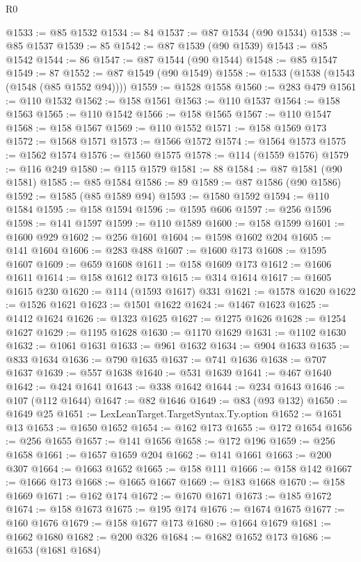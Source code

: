 \begin{lexlean}{R0}
\begin{coremodule}
@1533 := @85 @1532
@1534 := 84
@1537 := @87 @1534 (@90 @1534)
@1538 := @85 @1537
@1539 := 85
@1542 := @87 @1539 (@90 @1539)
@1543 := @85 @1542
@1544 := 86
@1547 := @87 @1544 (@90 @1544)
@1548 := @85 @1547
@1549 := 87
@1552 := @87 @1549 (@90 @1549)
@1558 := @1533 (@1538 (@1543 (@1548 (@85 @1552 @94))))
@1559 := @1528 @1558
@1560 := @283 @479
@1561 := @110 @1532
@1562 := @158 @1561
@1563 := @110 @1537
@1564 := @158 @1563
@1565 := @110 @1542
@1566 := @158 @1565
@1567 := @110 @1547
@1568 := @158 @1567
@1569 := @110 @1552
@1571 := @158 @1569 @173
@1572 := @1568 @1571
@1573 := @1566 @1572
@1574 := @1564 @1573
@1575 := @1562 @1574
@1576 := @1560 @1575
@1578 := @114 (@1559 @1576)
@1579 := @116 @249
@1580 := @115 @1579
@1581 := 88
@1584 := @87 @1581 (@90 @1581)
@1585 := @85 @1584
@1586 := 89
@1589 := @87 @1586 (@90 @1586)
@1592 := @1585 (@85 @1589 @94)
@1593 := @1580 @1592
@1594 := @110 @1584
@1595 := @158 @1594
@1596 := @1595 @606
@1597 := @256 @1596
@1598 := @141 @1597
@1599 := @110 @1589
@1600 := @158 @1599
@1601 := @1600 @929
@1602 := @256 @1601
@1604 := @1598 @1602 @204
@1605 := @141 @1604
@1606 := @283 @488
@1607 := @1600 @173
@1608 := @1595 @1607
@1609 := @659 @1608
@1611 := @158 @1609 @173
@1612 := @1606 @1611
@1614 := @158 @1612 @173
@1615 := @314 @1614
@1617 := @1605 @1615 @230
@1620 := @114 (@1593 @1617) @331
@1621 := @1578 @1620
@1622 := @1526 @1621
@1623 := @1501 @1622
@1624 := @1467 @1623
@1625 := @1412 @1624
@1626 := @1323 @1625
@1627 := @1275 @1626
@1628 := @1254 @1627
@1629 := @1195 @1628
@1630 := @1170 @1629
@1631 := @1102 @1630
@1632 := @1061 @1631
@1633 := @961 @1632
@1634 := @904 @1633
@1635 := @833 @1634
@1636 := @790 @1635
@1637 := @741 @1636
@1638 := @707 @1637
@1639 := @557 @1638
@1640 := @531 @1639
@1641 := @467 @1640
@1642 := @424 @1641
@1643 := @338 @1642
@1644 := @234 @1643
@1646 := @107 (@112 @1644)
@1647 := @82 @1646
@1649 := @83 (@93 @132)
@1650 := @1649 @25
@1651 := LexLeanTarget.TargetSyntax.Ty.option
@1652 := @1651 @13
@1653 := @1650 @1652
@1654 := @162 @173
@1655 := @172 @1654
@1656 := @256 @1655
@1657 := @141 @1656
@1658 := @172 @196
@1659 := @256 @1658
@1661 := @1657 @1659 @204
@1662 := @141 @1661
@1663 := @200 @307
@1664 := @1663 @1652
@1665 := @158 @111
@1666 := @158 @142
@1667 := @1666 @173
@1668 := @1665 @1667
@1669 := @183 @1668
@1670 := @158 @1669
@1671 := @162 @174
@1672 := @1670 @1671
@1673 := @185 @1672
@1674 := @158 @1673
@1675 := @195 @174
@1676 := @1674 @1675
@1677 := @160 @1676
@1679 := @158 @1677 @173
@1680 := @1664 @1679
@1681 := @1662 @1680
@1682 := @200 @326
@1684 := @1682 @1652 @173
@1686 := @1653 (@1681 @1684)

\end{coremodule}
\end{lexlean}
